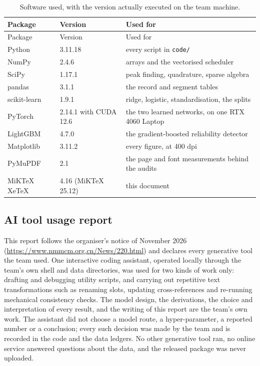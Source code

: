 \documentclass{swmcmthesis}
\begin{document}
\begin{appendices}
\begin{longtable}{p{}p{}p{}}
\caption{Software used, with the version actually executed on the team machine.}
\label{tab:software}\\
\toprule
Package & Version & Used for \\
\midrule
\endfirsthead
\toprule
Package & Version & Used for \\
\midrule
\endhead
\bottomrule
\endfoot
Python & 3.11.18 & every script in \texttt{code/} \\
NumPy & 2.4.6 & arrays and the vectorised scheduler \\
SciPy & 1.17.1 & peak finding, quadrature, sparse algebra \\
pandas & 3.1.1 & the record and segment tables \\
scikit-learn & 1.9.1 & ridge, logistic, standardisation, the splits \\
PyTorch & 2.14.1 with CUDA 12.6 & the two learned networks, on one RTX 4060 Laptop \\
LightGBM & 4.7.0 & the gradient-boosted reliability detector \\
Matplotlib & 3.11.2 & every figure, at 400 dpi \\
PyMuPDF & 2.1 & the page and font measurements behind the audits \\
MiKTeX XeTeX & 4.16 (MiKTeX 25.12) & this document \\
\bottomrule
\end{longtable}



\subsection*{AI tool usage report}

This report follows the organiser's notice of November 2026
(\url{https://www.nmmcm.org.cn/News/220.html}) and declares every generative tool the team
used. One interactive coding assistant, operated locally through the team's own shell and
data directories, was used for two kinds of work only: drafting and debugging utility
scripts, and carrying out repetitive text transformations such as renaming slots, updating
cross-references and re-running mechanical consistency checks. The model design, the
derivations, the choice and interpretation of every result, and the writing of this report
are the team's own work. The assistant did not choose a model route, a hyper-parameter,
a reported number or a conclusion; every such decision was made by the team and is
recorded in the code and the data ledgers. No other generative tool ran, no online
service answered questions about the data, and the released package was never uploaded.


\end{appendices}
\end{document}
